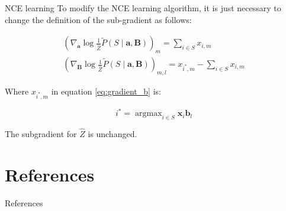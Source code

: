 \documentclass{beamer}
\DeclareMathOperator*{\argmax}{argmax}
\begin{document}
  \begin{frame}{NCE learning}
    To modify the NCE learning algorithm, it is just necessary to change the definition of the sub-gradient as follows:
    
    \begin{eqnarray}
      \left(\nabla_{\bm{a}} \log{\frac{1}{\hat{Z}} \tilde{P}\left(S \mid \bm{a},\bm{B} \right)}\right)_{m} = \sum_{i \in S}{x_{i,m}} \\
      \left(\nabla_{\bm{B}} \log{\frac{1}{\hat{Z}} \tilde{P}\left(S \mid \bm{a},\bm{B} \right)}\right)_{m, l} = x_{i^{*},m} - \sum_{i \in S}{x_{i,m}} \label{eq:gradient_b}
    \end{eqnarray}
    
    Where $x_{i^{*},m}$ in equation \ref{eq:gradient_b} is:
    
    \begin{equation*}
      i^{*} = \argmax_{i \in S} \bm{x}_{i} \bm{b}_{l}
    \end{equation*} 
    
    The subgradient for $\hat{Z}$ is unchanged.
    
  \end{frame}
  
  
  \section*{References}
  \begin{frame}{References}
    {}
  \end{frame}
\end{document}
